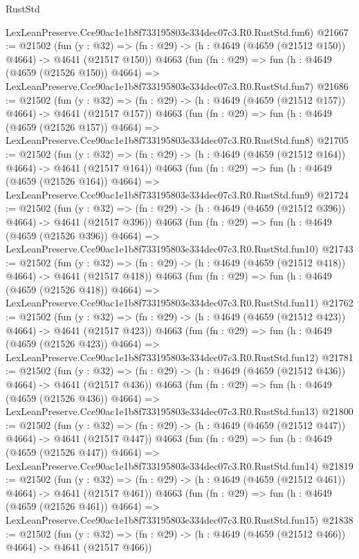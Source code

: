 \begin{lexlean}{RustStd}
\begin{coremodule}
    LexLeanPreserve.Cce90ac1e1b8f733195803e334dec07c3.R0.RustStd.fun6)
@21667 := @21502
    (fun (y : @32) => (fn : @29) -> (h : @4649 (@4659 (@21512 @150)) @4664) -> @4641 (@21517 @150))
    @4663
    (fun (fn : @29) =>
    fun (h : @4649 (@4659 (@21526 @150)) @4664) =>
    LexLeanPreserve.Cce90ac1e1b8f733195803e334dec07c3.R0.RustStd.fun7)
@21686 := @21502
    (fun (y : @32) => (fn : @29) -> (h : @4649 (@4659 (@21512 @157)) @4664) -> @4641 (@21517 @157))
    @4663
    (fun (fn : @29) =>
    fun (h : @4649 (@4659 (@21526 @157)) @4664) =>
    LexLeanPreserve.Cce90ac1e1b8f733195803e334dec07c3.R0.RustStd.fun8)
@21705 := @21502
    (fun (y : @32) => (fn : @29) -> (h : @4649 (@4659 (@21512 @164)) @4664) -> @4641 (@21517 @164))
    @4663
    (fun (fn : @29) =>
    fun (h : @4649 (@4659 (@21526 @164)) @4664) =>
    LexLeanPreserve.Cce90ac1e1b8f733195803e334dec07c3.R0.RustStd.fun9)
@21724 := @21502
    (fun (y : @32) => (fn : @29) -> (h : @4649 (@4659 (@21512 @396)) @4664) -> @4641 (@21517 @396))
    @4663
    (fun (fn : @29) =>
    fun (h : @4649 (@4659 (@21526 @396)) @4664) =>
    LexLeanPreserve.Cce90ac1e1b8f733195803e334dec07c3.R0.RustStd.fun10)
@21743 := @21502
    (fun (y : @32) => (fn : @29) -> (h : @4649 (@4659 (@21512 @418)) @4664) -> @4641 (@21517 @418))
    @4663
    (fun (fn : @29) =>
    fun (h : @4649 (@4659 (@21526 @418)) @4664) =>
    LexLeanPreserve.Cce90ac1e1b8f733195803e334dec07c3.R0.RustStd.fun11)
@21762 := @21502
    (fun (y : @32) => (fn : @29) -> (h : @4649 (@4659 (@21512 @423)) @4664) -> @4641 (@21517 @423))
    @4663
    (fun (fn : @29) =>
    fun (h : @4649 (@4659 (@21526 @423)) @4664) =>
    LexLeanPreserve.Cce90ac1e1b8f733195803e334dec07c3.R0.RustStd.fun12)
@21781 := @21502
    (fun (y : @32) => (fn : @29) -> (h : @4649 (@4659 (@21512 @436)) @4664) -> @4641 (@21517 @436))
    @4663
    (fun (fn : @29) =>
    fun (h : @4649 (@4659 (@21526 @436)) @4664) =>
    LexLeanPreserve.Cce90ac1e1b8f733195803e334dec07c3.R0.RustStd.fun13)
@21800 := @21502
    (fun (y : @32) => (fn : @29) -> (h : @4649 (@4659 (@21512 @447)) @4664) -> @4641 (@21517 @447))
    @4663
    (fun (fn : @29) =>
    fun (h : @4649 (@4659 (@21526 @447)) @4664) =>
    LexLeanPreserve.Cce90ac1e1b8f733195803e334dec07c3.R0.RustStd.fun14)
@21819 := @21502
    (fun (y : @32) => (fn : @29) -> (h : @4649 (@4659 (@21512 @461)) @4664) -> @4641 (@21517 @461))
    @4663
    (fun (fn : @29) =>
    fun (h : @4649 (@4659 (@21526 @461)) @4664) =>
    LexLeanPreserve.Cce90ac1e1b8f733195803e334dec07c3.R0.RustStd.fun15)
@21838 := @21502
    (fun (y : @32) => (fn : @29) -> (h : @4649 (@4659 (@21512 @466)) @4664) -> @4641 (@21517 @466))

\end{coremodule}
\end{lexlean}

